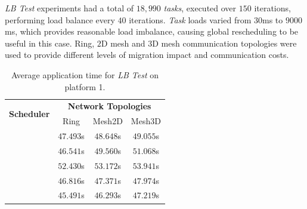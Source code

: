 \textit{LB Test} experiments had a total of $18,990$ \textit{tasks}, executed over $150$ iterations, performing load balance every $40$ iterations.
\textit{Task} loads varied from $30$ms to $9000$ms, which provides reasonable load imbalance, causing global rescheduling to be useful in this case.
Ring, $2$D mesh and $3$D mesh communication topologies were used to provide different levels of migration impact and communication costs.


\begin{table}[h]
	\centering
    \caption{Average application time for \textit{LB Test} on platform 1.}
	\begin{tabular}{l  c  c  c}
    \toprule
	\multirow{2}{*}{\textbf{Scheduler}} 	& \multicolumn{3}{c}{\textbf{Network Topologies}} \\ \cmidrule{2-4}
 								& Ring & Mesh2D & Mesh3D \\
	\midrule
        \distributedlb 		& $47.493$s & $48.648$s & $49.055$s \\
        \greedylb 			& $46.541$s & $49.560$s & $51.068$s \\
        \dummylb 			& $52.430$s & $53.172$s & $53.941$s \\
        \packdrop 			& $46.816$s & $47.371$s & $47.974$s \\
         			& $45.491$s & $46.293$s & $47.219$s \\
        \bottomrule
	\end{tabular}
    \label{tab:lbtest:apptime}
\end{table}



